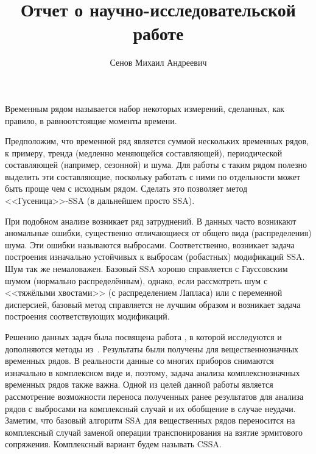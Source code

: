 \documentclass[specialist,
               substylefile = spbu.rtx,
               subf,href,colorlinks=true, 12pt]{disser}
\begin{document}

\title{Отчет о научно-исследовательской работе}


\author{Сенов Михаил Андреевич}


\date{\number\year}

\maketitle

\tableofcontents

\intro
Временным рядом называется набор некоторых измерений, сделанных, как правило, в равноотстоящие моменты времени.

Предположим, что временной ряд является суммой нескольких временных рядов, к примеру, тренда (медленно меняющейся составляющей), периодической составляющей (например, сезонной) и шума. Для работы с таким рядом полезно выделить эти составляющие, поскольку работать с ними по отдельности может быть проще чем с исходным рядом. Сделать это позволяет метод <<Гусеница>>-SSA (в дальнейшем просто SSA).

При подобном анализе возникает ряд затруднений. В данных часто возникают аномальные ошибки, существенно отличающиеся от общего вида (распределения) шума. Эти ошибки называются выбросами. Соответственно, возникает задача построения изначально устойчивых к выбросам (робастных) модификаций SSA. Шум так же немаловажен. Базовый SSA хорошо справляется с Гауссовским шумом (нормально распределённым), однако, если рассмотреть шум с <<тяжёлыми хвостами>> (с распределением Лапласа) или с переменной дисперсией, базовый метод справляется не лучшим образом и возникает задача построения соответствующих модификаций. 

Решению данных задач была посвящена работа \cite{Tretyakova20}, в которой исследуются и дополняются методы из~\cite{Trickett.etal2012,Kalantari.etal2016}. Результаты были получены для вещественнозначных временных рядов. В реальности данные со многих приборов снимаются изначально в комплексном виде и, поэтому, задача анализа комплекснозначных временных рядов также важна. Одной из целей данной работы является рассмотрение возможности переноса полученных ранее результатов для анализа рядов с выбросами на комплексный случай и их обобщение в случае неудачи. Заметим, что базовый алгоритм SSA для вещественных рядов переносится на комплексный случай заменой операции транспонирования на взятие эрмитового сопряжения. Комплексный вариант будем называть CSSA.
\end{document}

